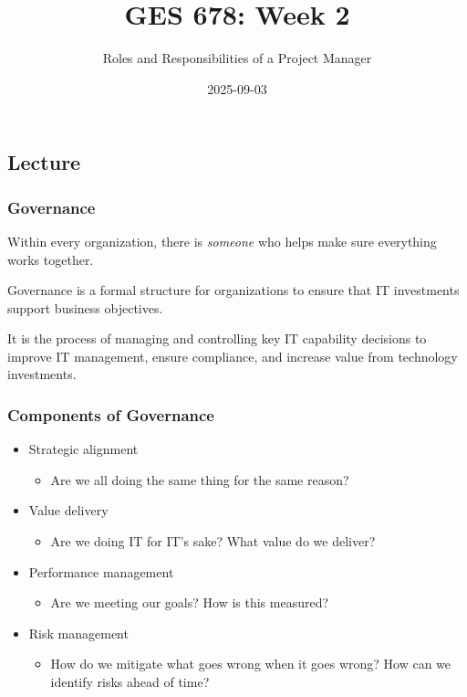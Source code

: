 \documentclass[
  letterpaper,
  DIV=11,
  numbers=noendperiod]{scrartcl}
\title{GES 678: Week 2}
\subtitle{Roles and Responsibilities of a Project Manager}
\author{}
\date{2025-09-03}
\providecommand{\tightlist}{%
  \setlength{\itemsep}{0pt}\setlength{\parskip}{0pt}}\usepackage{longtable,booktabs,array}
\renewcommand*\contentsname{Table of contents}
\newcommand\contentsname{Table of contents}
\begin{document}
\maketitle

\renewcommand*\contentsname{Table of contents}
{
\hypersetup{linkcolor=}
\setcounter{tocdepth}{3}
\tableofcontents
}

\newpage{}

\subsection{Lecture}\label{lecture}

\subsubsection{Governance}\label{governance}

Within every organization, there is \emph{someone} who helps make sure
everything works together.

Governance is a formal structure for organizations to ensure that IT
investments support business objectives.

It is the process of managing and controlling key IT capability
decisions to improve IT management, ensure compliance, and increase
value from technology investments.

\subsubsection{Components of Governance}\label{components-of-governance}

\begin{itemize}
\tightlist
\item
  Strategic alignment

  \begin{itemize}
  \tightlist
  \item
    Are we all doing the same thing for the same reason?
  \end{itemize}
\item
  Value delivery

  \begin{itemize}
  \tightlist
  \item
    Are we doing IT for IT's sake? What value do we deliver?
  \end{itemize}
\item
  Performance management

  \begin{itemize}
  \tightlist
  \item
    Are we meeting our goals? How is this measured?
  \end{itemize}
\item
  Risk management

  \begin{itemize}
  \tightlist
  \item
    How do we mitigate what goes wrong when it goes wrong? How can we
    identify risks ahead of time?
  \end{itemize}
\end{itemize}
\end{document}

